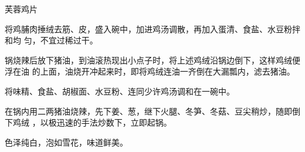 \begin{recipe}{芙蓉鸡片}

\ingredients


\cooking

将鸡脯肉捶绒去筋、皮，盛入碗中，加进鸡汤调散，再加入蛋清、食盐、水豆粉拌和均
匀，不宜过稀过干。

锅烧辣后放下猪油，到油滚热现出小点子时，将上述鸡绒沿锅边倒下，这样鸡绒便浮在油
的上面，油烧开冲起来时，即将鸡绒连油一齐倒在大漏瓢内，滤去猪油。

将味精、食盐、胡椒面、水豆粉、连同少许鸡汤调和在一碗中。

在锅内用二两猪油烧辣，先下姜、葱，继下火腿、冬笋、冬菇、豆尖稍炒，随即倒下鸡绒
，以极迅速的手法炒数下，立即起锅。

\features

色泽纯白，泡如雪花，味道鲜美。

\end{recipe}

